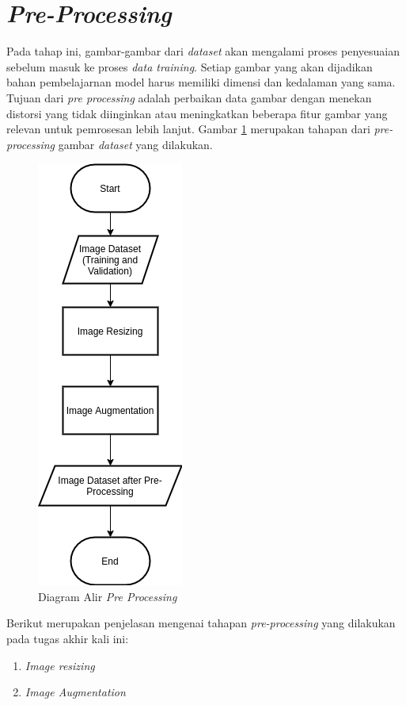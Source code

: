 \section{\textit{Pre-Processing}}
\label{sec:preprocessing}

Pada tahap ini, gambar-gambar dari \textit{dataset} akan mengalami proses penyesuaian sebelum masuk ke proses \textit{data training}. Setiap gambar yang akan dijadikan bahan pembelajarnan model harus memiliki dimensi dan kedalaman yang sama. Tujuan dari \textit{pre processing} adalah perbaikan data gambar dengan menekan distorsi yang tidak diinginkan atau meningkatkan beberapa fitur gambar yang relevan untuk pemrosesan lebih lanjut. Gambar \ref{fig:preprocessing} merupakan tahapan dari \textit{pre-processing} gambar \textit{dataset} yang dilakukan.

\begin{figure}[ht]
	\centering
	\includegraphics[scale=0.5]{gambar/flowchart-preprocessing.png}
	\caption{Diagram Alir \textit{Pre Processing}}
	\label{fig:preprocessing}
\end{figure}

Berikut merupakan penjelasan mengenai tahapan \textit{pre-processing} yang dilakukan pada tugas akhir kali ini:
\begin{enumerate}
	\item \textit{Image resizing}\\
	
	\item \textit{Image Augmentation}\\
\end{enumerate}


